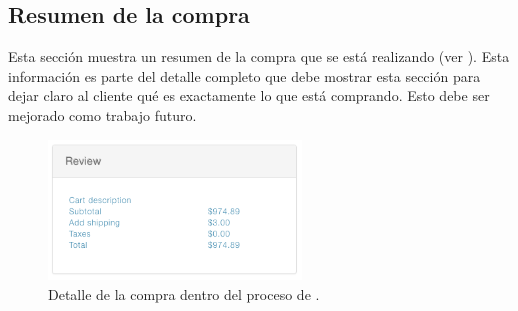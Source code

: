 \subsection{Resumen de la compra}\label{chapter:solucionimplementada:checkout:review}

	Esta sección muestra un resumen de la compra que se está realizando (ver ). Esta información es parte del detalle completo que debe mostrar esta sección para dejar claro al cliente qué es exactamente lo que está comprando. Esto debe ser mejorado como trabajo futuro.

	\begin{figure}[!h]
		\centering
		\includegraphics[width=0.6\textwidth]{figuras/checkout/review_step.png}
		\caption{Detalle de la compra dentro del proceso de \checkoutEF.}
		\label{figure:review:checkout:summary}
	\end{figure}